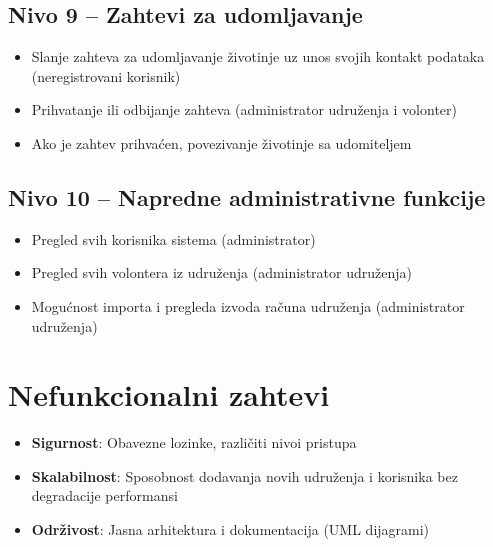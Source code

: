 \subsection{Nivo 9 – Zahtevi za udomljavanje}

\begin{itemize}
    \item Slanje zahteva za udomljavanje životinje uz unos svojih kontakt podataka (neregistrovani korisnik)
    \item Prihvatanje ili odbijanje zahteva (administrator udruženja i volonter)
    \item Ako je zahtev prihvaćen, povezivanje životinje sa udomiteljem
\end{itemize}

\subsection{Nivo 10 – Napredne administrativne funkcije}

\begin{itemize}
    \item Pregled svih korisnika sistema (administrator)
    \item Pregled svih volontera iz udruženja (administrator udruženja)
    \item Mogućnost importa i pregleda izvoda računa udruženja (administrator udruženja)
\end{itemize}

\section{Nefunkcionalni zahtevi}

\begin{itemize}
    \item \textbf{Sigurnost}: Obavezne lozinke, različiti nivoi pristupa
    \item \textbf{Skalabilnost}: Sposobnost dodavanja novih udruženja i korisnika bez degradacije performansi
    \item \textbf{Održivost}: Jasna arhitektura i dokumentacija (UML dijagrami)
\end{itemize}
